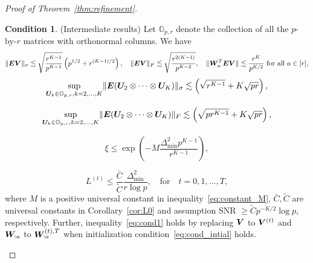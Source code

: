 \documentclass[lettersize,onecolumn,journal]{IEEEtran}
\theoremstyle{definition}
\theoremstyle{definition}
\newtheorem{condition}{Condition}
\newcommand{\of}[1]{\left(#1\right)}
\begin{document}
\begin{proof}[Proof of Theorem~\ref{thm:refinement}]
\begin{condition}(Intermediate results) \label{cond:origin} Let $\mathbb{O}_{p, r}$ denote the collection of all the $p$-by-$r$ matrices with orthonormal columns. We have 
\begin{equation}\label{eq:cond1}
    \onormSize{}{\mE \mV}_\sigma \lesssim \sqrt{\frac{r^{K-1}}{p^{K-1}}} \of{ p ^{1/2}+ r^{(K-1)/2}}, \quad \onormSize{}{\mE \mV}_F \lesssim \sqrt{\frac{ r^{2(K-1)}}{p^{K-2}}},\quad \onormSize{}{ \mW_{a:}^T \mE \mV} \lesssim \frac{r^K}{p^{K/2}} \text{ for all }a \in [r], 
\end{equation}
\begin{equation}\label{eq:cond2}
    \sup_{ \mU_k \in \mathbb{O}_{p, r}, k = 2,\ldots, K } \onormSize{}{ \mE (\mU_{2} \otimes \cdots \otimes \mU_K)}_\sigma \lesssim \of{ \sqrt{r^{K-1}} + K\sqrt{pr}},
\end{equation}

\begin{equation}\label{eq:cond3}
    \sup_{ \mU_k \in \mathbb{O}_{p, r}, k = 2,\ldots, K } \onormSize{}{ \mE (\mU_{2} \otimes \cdots \otimes \mU_K)}_F \lesssim \of{ \sqrt{pr^{K-1}} + K\sqrt{pr}},
\end{equation}

\begin{equation}\label{eq:cond_oracle}
    \xi \leq \exp\of{ - M \frac{\Delta_{\min}^2 p^{K-1}}{r^{K-1}}},
\end{equation}

\begin{equation}\label{eq:cond_intial}
    L^{(t)} \leq \frac{\bar C}{\tilde C} \frac{\Delta_{\min}^2}{r \log p}, \quad \text{for} \quad t = 0, 1, \ldots, T,
\end{equation}
where $M$ is a positive universal constant in inequality~\eqref{eq:constant_M}, $\bar C, \tilde C$ are universal constants in Corollary~\ref{cor:L0} and assumption SNR $\geq \tilde C p^{-K/2} \log p$, respectively. Further, inequality~\eqref{eq:cond1} holds by replacing $\bm{V}$ to $\bm{V}^{(t)}$ and $\bm{W}_{:a}$ to $\bm{W}_{:a}^{(t),T}$ when initialization condition~\eqref{eq:cond_intial} holds.
\end{condition}



\end{proof}
\end{document}
